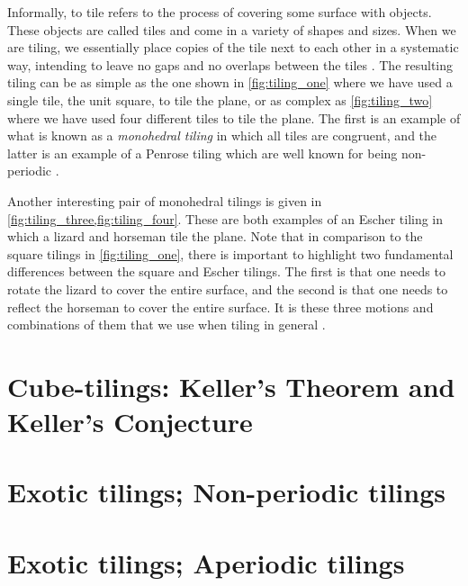 \documentclass[../thesis.tex]{subfiles}
\begin{document}
Informally, to tile refers to the process of covering some surface with objects. These objects are called tiles and come in a variety of shapes and sizes. When we are tiling, we essentially place copies of the tile next to each other in a systematic way, intending to leave no gaps and no overlaps between the tiles \cite{kolountzakisTilingsTranslation2010}. The resulting tiling can be as simple as the one shown in \cref{fig:tiling_one} where we have used a single tile, the unit square, to tile the plane, or as complex as \cref{fig:tiling_two} where we have used four different tiles to tile the plane. The first is an example of what is known as a \emph{monohedral tiling} in which all tiles are congruent, and the latter is an example of a Penrose tiling which are well known for being non-periodic \cite[p. 20, 531]{grunbaumTilingsPatterns1987}. %



Another interesting pair of monohedral tilings is given in \cref{fig:tiling_three,fig:tiling_four}. These are both examples of an Escher tiling in which a lizard and horseman tile the plane. Note that in comparison to the square tilings in \cref{fig:tiling_one}, there is important to highlight two fundamental differences between the square and Escher tilings. The first is that one needs to rotate the lizard to cover the entire surface, and the second is that one needs to reflect the horseman to cover the entire surface. It is these three motions and combinations of them that we use when tiling in general \cite[p. 26]{kolountzakisTilingsTranslation2010,grunbaumTilingsPatterns1987}. 



\section{Cube-tilings: Keller's Theorem and Keller's Conjecture}
    


\section{Exotic tilings; Non-periodic tilings}
    

\section{Exotic tilings; Aperiodic tilings}\label{sec:aperi_cube}
    
\end{document}
